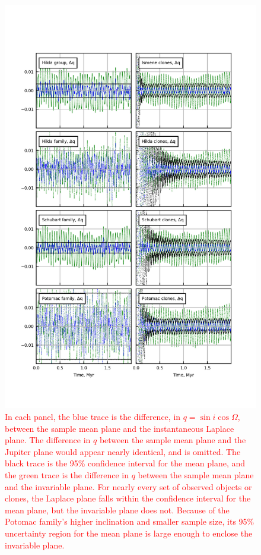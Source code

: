 \documentclass[a4paper,fleqn]{cas-sc}
\begin{document}
\begin{linenumbers}
\begin{centering}
\begin{figure}
\includegraphics[width=4.5in]{figure4.png}
\caption{
\textcolor{red}{In each panel, the blue trace is the difference, in $q=\sin{i}\cos{\Omega}$, between the sample mean plane and the instantaneous Laplace plane.
The difference in $q$ between the sample mean plane and the Jupiter plane would appear nearly identical, and is omitted.
The black trace is the 95\% confidence interval for the mean plane, and the green trace is the difference in $q$ between the sample mean plane and the invariable plane.
For nearly every set of observed objects or clones, the Laplace plane falls within the confidence interval for the mean plane, but the invariable plane does not.
Because of the Potomac family's higher inclination and smaller sample size, its 95\% uncertainty region for the mean plane is large enough to enclose the invariable plane.}
}
\label{fig:fig_twelve_i_plots}
\end{figure}
\end{centering}


\end{linenumbers}
\end{document}
